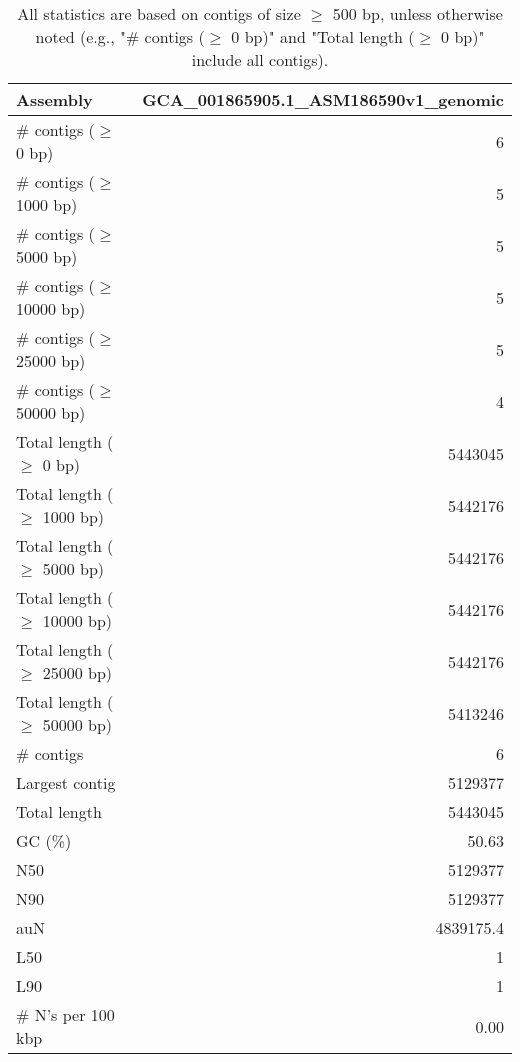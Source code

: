 \documentclass[12pt,a4paper]{article}
\begin{document}
\begin{table}[ht]
\begin{center}
\caption{All statistics are based on contigs of size $\geq$ 500 bp, unless otherwise noted (e.g., "\# contigs ($\geq$ 0 bp)" and "Total length ($\geq$ 0 bp)" include all contigs).}
\begin{tabular}{|l*{1}{|r}|}
\hline
Assembly & GCA\_001865905.1\_ASM186590v1\_genomic \\ \hline
\# contigs ($\geq$ 0 bp) & 6 \\ \hline
\# contigs ($\geq$ 1000 bp) & 5 \\ \hline
\# contigs ($\geq$ 5000 bp) & 5 \\ \hline
\# contigs ($\geq$ 10000 bp) & 5 \\ \hline
\# contigs ($\geq$ 25000 bp) & 5 \\ \hline
\# contigs ($\geq$ 50000 bp) & 4 \\ \hline
Total length ($\geq$ 0 bp) & 5443045 \\ \hline
Total length ($\geq$ 1000 bp) & 5442176 \\ \hline
Total length ($\geq$ 5000 bp) & 5442176 \\ \hline
Total length ($\geq$ 10000 bp) & 5442176 \\ \hline
Total length ($\geq$ 25000 bp) & 5442176 \\ \hline
Total length ($\geq$ 50000 bp) & 5413246 \\ \hline
\# contigs & 6 \\ \hline
Largest contig & 5129377 \\ \hline
Total length & 5443045 \\ \hline
GC (\%) & 50.63 \\ \hline
N50 & 5129377 \\ \hline
N90 & 5129377 \\ \hline
auN & 4839175.4 \\ \hline
L50 & 1 \\ \hline
L90 & 1 \\ \hline
\# N's per 100 kbp & 0.00 \\ \hline
\end{tabular}
\end{center}
\end{table}
\end{document}
